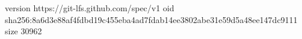 version https://git-lfs.github.com/spec/v1
oid sha256:8a6d3e88af4fdbd19c455eba4ad7fdab14ee3802abe31e59d5a48ee147dc9111
size 30962
